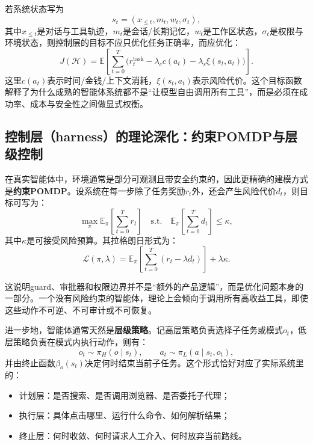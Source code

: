 \documentclass[12pt,a4paper]{article}
\begin{document}
若系统状态写为
\begin{equation}
s_t = (x_{\leq t}, m_t, w_t, \sigma_t),
\end{equation}
其中$x_{\leq t}$是对话与工具轨迹，$m_t$是会话/长期记忆，$w_t$是工作区状态，$\sigma_t$是权限与环境状态，则控制层的目标不应只优化任务正确率，而应优化：
\begin{equation}
J(\mathcal{H}) = \mathbb{E}\left[\sum_{t=0}^{T} \big(r^{\text{task}}_t - \lambda_c c(a_t) - \lambda_s \xi(s_t,a_t)\big)\right].
\end{equation}
这里$c(a_t)$表示时间/金钱/上下文消耗，$\xi(s_t,a_t)$表示风险代价。这个目标函数解释了为什么成熟的智能体系统都不是“让模型自由调用所有工具”，而是必须在成功率、成本与安全性之间做显式权衡。
\subsection{控制层（harness）的理论深化：约束POMDP与层级控制}

在真实智能体中，环境通常是部分可观测且带安全约束的，因此更精确的建模方式是\textbf{约束POMDP}。设系统在每一步除了任务奖励$r_t$外，还会产生风险代价$d_t$，则目标可写为：
\begin{equation}
\max_{\pi} \mathbb{E}_{\pi}\left[\sum_{t=0}^{T} r_t\right]
\quad \text{s.t.} \quad
\mathbb{E}_{\pi}\left[\sum_{t=0}^{T} d_t\right] \le \kappa,
\end{equation}
其中$\kappa$是可接受风险预算。其拉格朗日形式为：
\begin{equation}
\mathcal{L}(\pi,\lambda) = \mathbb{E}_{\pi}\left[\sum_{t=0}^{T} (r_t - \lambda d_t)\right] + \lambda \kappa.
\end{equation}

这说明guard、审批器和权限边界并不是“额外的产品逻辑”，而是优化问题本身的一部分。一个没有风险约束的智能体，理论上会倾向于调用所有高收益工具，即使这些动作不可逆、不可审计或不可恢复。

进一步地，智能体通常天然是\textbf{层级策略}。记高层策略负责选择子任务或模式$o_t$，低层策略负责在模式内执行动作，则有：
\begin{equation}
o_t \sim \pi_H(o \mid s_t), \qquad a_t \sim \pi_L(a \mid s_t, o_t),
\end{equation}
并由终止函数$\beta_o(s_t)$决定何时结束当前子任务。这个形式恰好对应了实际系统里的：
\begin{itemize}
    \item 计划层：是否搜索、是否调用浏览器、是否委托子代理；
    \item 执行层：具体点击哪里、运行什么命令、如何解析结果；
    \item 终止层：何时收敛、何时请求人工介入、何时放弃当前路线。
\end{itemize}
\end{document}
